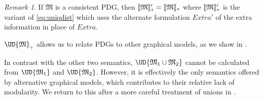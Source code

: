 \documentclass{article}
\theoremstyle{plain}
\theoremstyle{definition}
\theoremstyle{remark}
\newtheorem*{remark}{Remark}
\DeclarePairedDelimiter{\bbr}{\llbracket}{\rrbracket}
\newcommand{\dg}[1]{\mathfrak{#1}}
\newcommand\extrsymb{\mathit{Extra}}
\numberwithin{equation}{section}
\begin{document}
	\begin{remark}
		If $\dg M$ is a consistent PDG, then 
		$\bbr{\dg M}'_* = \bbr{\dg M}_*$
	 	where $\bbr{\dg M}'_*$ is the variant of \eqref{eq:uniqdist} which uses the alternate formulation $\extrsymb'$ of the extra information in place of $\extrsymb$.
	\end{remark}

    $\UD{\dg M}_\gamma$ allows us to relate PDGs to other
    graphical models, as we show in .


\begin{vleftovers}

      In contrast with the other two semantics, $\UD{\dg M_1 \cup
          \dg M_2}$ cannot be calculated from $\UD{\dg M_1}$ and
        $\UD{\dg M_2}$. However, it is effectively the only semantics
        offered by alternative graphical models, which contributes to
        their relative lack of modularity. We return to this after a
        more careful treatment of unions in
        .
\end{vleftovers}
        
\end{document}
